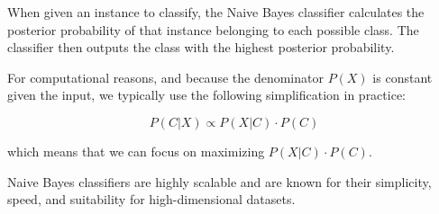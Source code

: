 When given an instance to classify, the Naive Bayes classifier
calculates the posterior probability of that instance belonging to
each possible class. The classifier then outputs the class with the
highest posterior probability.

For computational reasons, and because the denominator $P(X)$ is
constant given the input, we typically use the following
simplification in practice:

\begin{equation*}
P(C|X) \propto P(X|C) \cdot P(C)
\end{equation*}

which means that we can focus on maximizing $P(X|C) \cdot P(C)$.

Naive Bayes classifiers are highly scalable and are known for their
simplicity, speed, and suitability for high-dimensional datasets.
